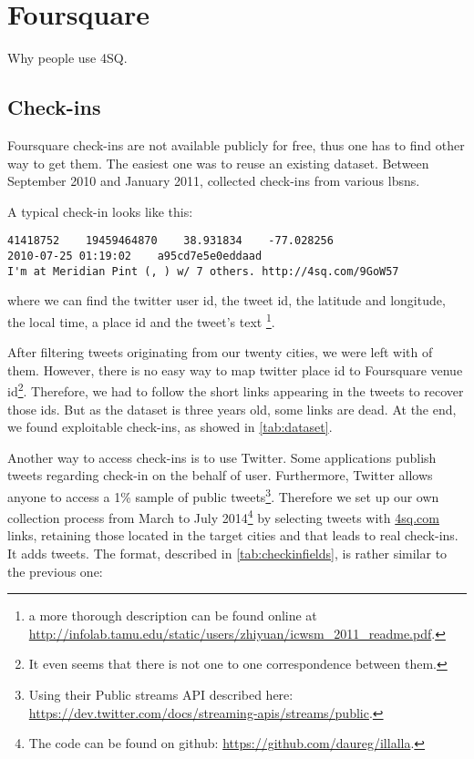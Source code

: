 \section{Foursquare}

Why people use 4SQ\autocite{FSMotivation11}.

\subsection{Check-ins}

Foursquare check-ins are not available publicly for free, thus one has to
find other way to get them. The easiest one was to reuse an existing dataset.
Between September 2010 and January 2011, \textcite{dataset11} collected
 check-ins from various \glspl{lbsn}.

A typical check-in looks like this:
\begin{verbatim}
41418752    19459464870    38.931834    -77.028256
2010-07-25 01:19:02    a95cd7e5e0eddaad
I'm at Meridian Pint (, ) w/ 7 others. http://4sq.com/9GoW57
\end{verbatim}

where we can find the twitter user id, the tweet id, the
latitude and longitude, the local time, a place id and the tweet's text
\footnote{a more thorough description can be found online
at \href{http://infolab.tamu.edu/static/users/zhiyuan/icwsm\_2011\_readme.pdf}%
{\url{http://infolab.tamu.edu/static/users/zhiyuan/icwsm\_2011\_readme.pdf}}.}.

After filtering tweets originating from our twenty cities, we were left with
 of them. However, there is no easy way to map twitter place
id to Foursquare venue id\footnote{It even seems that there is not one to one
correspondence between them.}. Therefore, we had to follow the short links
appearing in the tweets to recover those ids. But as the dataset is three
years old, some links are dead. At the end, we found 
exploitable check-ins, as showed in \autoref{tab:dataset}.

\medskip

Another way to access check-ins is to use Twitter. Some applications publish
tweets regarding check-in on the behalf of user. Furthermore, Twitter allows
anyone to access a 1\% sample of public tweets\footnote{Using their Public
streams API described here:
\href{https://dev.twitter.com/docs/streaming-apis/streams/public}%
{\url{https://dev.twitter.com/docs/streaming-apis/streams/public}}.}.
 Therefore we set up our own
collection process from March to July 2014\footnote{The code can be found on
github: \href{https://github.com/daureg/illalla}%
{\url{https://github.com/daureg/illalla}}.} by selecting tweets with
\url{4sq.com} links, retaining those located in the target cities and that
leads to real check-ins. It adds  tweets. The format,
described in \autoref{tab:checkinfields}, is rather similar to the previous
one:

